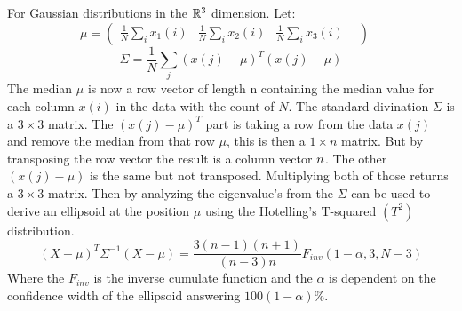 \par For Gaussian distributions in the $\mathbb{R}^3$ dimension.
Let:
\begin{equation}
    \mu = \begin{pmatrix}
        \frac{1}{N}\sum_i{x_1(i)} &
        \frac{1}{N}\sum_i{x_2(i)} &
        \frac{1}{N}\sum_i{x_3(i)} &
    \end{pmatrix}
    \quad
\end{equation}
\begin{equation}
    \Sigma = \frac{1}{N} \sum_j{(x(j) - \mu)^T(x(j) - \mu)}
\end{equation}
The median $\mu$ is now a row vector of length n containing the median value for each column $x(i)$ in the data with the count of $N$.
The standard divination $\Sigma$ is a $3\times 3$ matrix.
The $(x(j) - \mu)^T$ part is taking a row from the data $x(j)$ and remove the median from that row $\mu$, this is then a $1\times n$ matrix.
But by transposing the row vector the result is a column vector $n \time 1$.
The other $(x(j) - \mu)$ is the same but not transposed.
Multiplying both of those returns a $3\times 3$ matrix.
Then by analyzing the eigenvalue's from the $\Sigma$ can be used to derive an ellipsoid at the position $\mu$ using the Hotelling's T-squared
$(T^2)$ distribution.
\begin{equation}
    (X - \mu)^T\Sigma^{-1}(X - \mu)=\frac{3(n-1)(n+1)}{(n-3)n} F_{inv}(1-\alpha, 3, N - 3)
\end{equation}
Where the $F_{inv}$ is the inverse cumulate function and the $\alpha$ is dependent on the confidence width of the ellipsoid answering $100(1-\alpha)\%$.



